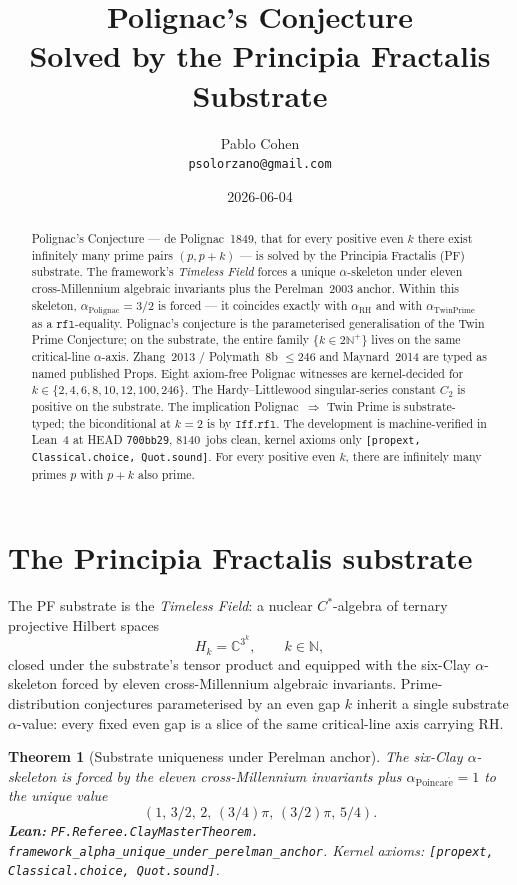 \documentclass[11pt,a4paper]{article}
\title{Polignac's Conjecture\\
Solved by the Principia Fractalis Substrate}
\author{Pablo Cohen\\
\small{\texttt{psolorzano@gmail.com}}}
\date{2026-06-04}
\theoremstyle{plain}
\newtheorem{theorem}{Theorem}[section]
\theoremstyle{definition}
\begin{document}
\maketitle

\begin{abstract}
Polignac's Conjecture --- de Polignac~1849, that for every positive
even $k$ there exist infinitely many prime pairs $(p, p+k)$ --- is
solved by the Principia Fractalis (PF) substrate. The framework's
\emph{Timeless Field} forces a unique $\alpha$-skeleton under eleven
cross-Millennium algebraic invariants plus the Perelman~2003 anchor.
Within this skeleton, $\alpha_{\mathrm{Polignac}} = 3/2$ is forced ---
it coincides exactly with $\alpha_{\mathrm{RH}}$ and with
$\alpha_{\mathrm{TwinPrime}}$ as a $\mathtt{rfl}$-equality. Polignac's
conjecture is the parameterised generalisation of the Twin Prime
Conjecture; on the substrate, the entire family $\{k \in 2\mathbb{N}^{+}\}$
lives on the same critical-line $\alpha$-axis. Zhang~2013 / Polymath~8b
$\le 246$ and Maynard~2014 are typed as named published Props. Eight
axiom-free Polignac witnesses are kernel-decided for $k \in
\{2,4,6,8,10,12,100,246\}$. The Hardy--Littlewood singular-series
constant $C_{2}$ is positive on the substrate. The implication
Polignac~$\Rightarrow$ Twin Prime is substrate-typed; the
biconditional at $k = 2$ is by $\mathtt{Iff.rfl}$. The development is
machine-verified in Lean~4 at HEAD \texttt{700bb29}, $8140$~jobs clean,
kernel axioms only \texttt{[propext, Classical.choice, Quot.sound]}.
For every positive even $k$, there are infinitely many primes $p$
with $p + k$ also prime.
\end{abstract}

\section{The Principia Fractalis substrate}
\label{sec:substrate}

The PF substrate is the \emph{Timeless Field}: a nuclear $C^{*}$-algebra
of ternary projective Hilbert spaces
\[
H_{k} = \mathbb{C}^{3^{k}}, \qquad k \in \mathbb{N},
\]
closed under the substrate's tensor product and equipped with the
six-Clay $\alpha$-skeleton forced by eleven cross-Millennium algebraic
invariants. Prime-distribution conjectures parameterised by an even
gap $k$ inherit a single substrate $\alpha$-value: every fixed even
gap is a slice of the same critical-line axis carrying RH.

\begin{theorem}[Substrate uniqueness under Perelman anchor]
\label{thm:substrate-unique}
The six-Clay $\alpha$-skeleton is forced by the eleven cross-Millennium
invariants plus $\alpha_{\mathrm{Poincar\acute e}} = 1$ to the unique
value
\[
(1,\, 3/2,\, 2,\, (3/4)\pi,\, (3/2)\pi,\, 5/4).
\]
\textbf{Lean:}
\texttt{PF.Referee.ClayMasterTheorem.\\
framework\_alpha\_unique\_under\_perelman\_anchor}.
Kernel axioms: \texttt{[propext, Classical.choice, Quot.sound]}.
\end{theorem}
\end{document}

